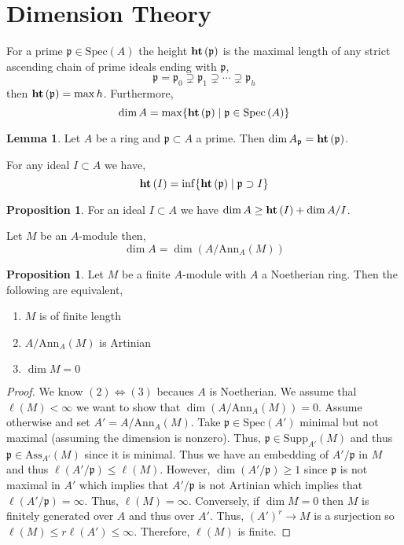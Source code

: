 \documentclass[12pt]{article}
\newcommand{\Ann}[2]{\mathrm{Ann}_{#1}\left(#2\right)}
\newcommand{\Ass}[2]{\mathrm{Ass}_{#1}\left( #2 \right)}
\newcommand{\Supp}[2]{\mathrm{Supp}_{#1}\left( #2 \right)}
\newcommand{\spec}[1]{\mathrm{Spec}\left( #1 \right)}
\newcommand{\Spec}[1]{\mathrm{Spec}\left( #1 \right)}
\newcommand{\p}{\mathfrak{p}}
\theoremstyle{remark}
\theoremstyle{definition}
\newtheorem{lemma}[theorem]{Lemma}
\newtheorem{proposition}[theorem]{Proposition}
\newenvironment{definition}[1][Definition:]{\begin{trivlist}
\item[\hskip \labelsep {\bfseries #1}]}{\end{trivlist}}
\begin{document}
\section{Dimension Theory}

\begin{definition}
For a prime $\p \in \spec{A}$ the height $\height{\p}$ is the maximal length of any strict ascending chain of prime ideals ending with $\p$,
\[ \p = \p_0 \supsetneq \p_1 \supsetneq \cdots \supsetneq \p_h \]
then $\height{\p} = \max{h}$.
Furthermore,
\[ \dim{A} = \max\{ \height{\p} \mid \p \in \spec{A} \} \] 
\end{definition}

\begin{lemma}
Let $A$ be a ring and $\p \subset A$ a prime. Then $\dim{A_{\p}} = \height{\p}$.
\end{lemma}

\begin{definition}
For any ideal $I \subset A$ we have,
\[ \height{I} = \inf\{ \height{\p} \mid \p \supset I \} \]
\end{definition}

\begin{proposition}
For an ideal $I \subset A$ we have $\dim{A} \ge \mathbf{ht}\left( I \right) + \dim{A / I}$. 
\end{proposition}


\begin{definition}
Let $M$ be an $A$-module then,
\[ \dim{A} = \dim{\left( A / \Ann{A}{M} \right)} \]
\end{definition}

\begin{proposition}
Let $M$ be a finite $A$-module with $A$ a Noetherian ring. Then the following are equivalent,
\begin{enumerate}
\item $M$ is of finite length
\item $A / \Ann{A}{M}$ is Artinian
\item $\dim{M} = 0$
\end{enumerate}
\end{proposition}

\begin{proof}
We know $(2) \iff (3)$ becaues $A$ is Noetherian. We assume thal $\ell(M) < \infty$ we want to show that $\dim{(A / \Ann{A}{M})} = 0$. Assume otherwise and set $A' = A / \Ann{A}{M}$. Take $\p \in \Spec{A'}$ minimal but not maximal (assuming the dimension is nonzero). Thus, $\p \in \Supp{A'}{M}$ and thus $\p \in \Ass{A'}{M}$ since it is minimal. Thus we have an embedding of $A' / \p$ in $M$ and thus $\ell(A' / \p) \le \ell(M)$. However, $\dim{(A' / \p)} \ge 1$ since $\p$ is not maximal in $A'$ which implies that $A' / \p$ is not Artinian which implies that $\ell(A' / \p) = \infty$. Thus, $\ell(M) = \infty$. Conversely, if $\dim{M} = 0$ then $M$ is finitely generated over $A$ and thus over $A'$. Thus, $(A')^r \to M$ is a surjection so $\ell(M) \le r \ell(A') \le \infty$. Therefore, $\ell(M)$ is finite.
\end{proof}
\end{document}
